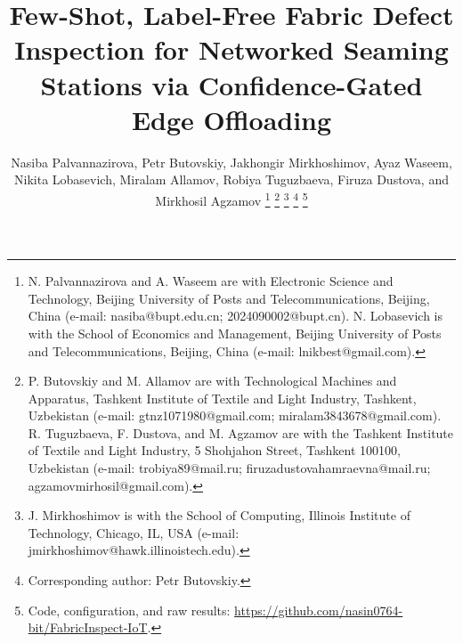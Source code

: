 \documentclass[lettersize,journal]{IEEEtran}
\begin{document}
\title{Few-Shot, Label-Free Fabric Defect Inspection for Networked Seaming Stations via Confidence-Gated Edge Offloading}

\author{Nasiba Palvannazirova, Petr Butovskiy, Jakhongir Mirkhoshimov, Ayaz Waseem, Nikita Lobasevich, Miralam Allamov, Robiya Tuguzbaeva, Firuza Dustova, and Mirkhosil Agzamov%
  \thanks{N. Palvannazirova and A. Waseem are with Electronic Science and Technology, Beijing University of Posts and Telecommunications, Beijing, China (e-mail: nasiba@bupt.edu.cn; 2024090002@bupt.cn). N. Lobasevich is with the School of Economics and Management, Beijing University of Posts and Telecommunications, Beijing, China (e-mail: lnikbest@gmail.com).}%
  \thanks{P. Butovskiy and M. Allamov are with Technological Machines and Apparatus, Tashkent Institute of Textile and Light Industry, Tashkent, Uzbekistan (e-mail: gtnz1071980@gmail.com; miralam3843678@gmail.com). R. Tuguzbaeva, F. Dustova, and M. Agzamov are with the Tashkent Institute of Textile and Light Industry, 5 Shohjahon Street, Tashkent 100100, Uzbekistan (e-mail: trobiya89@mail.ru; firuzadustovahamraevna@mail.ru; agzamovmirhosil@gmail.com).}%
  \thanks{J. Mirkhoshimov is with the School of Computing, Illinois Institute of Technology, Chicago, IL, USA (e-mail: jmirkhoshimov@hawk.illinoistech.edu).}%
  \thanks{Corresponding author: Petr Butovskiy.}%
  \thanks{Code, configuration, and raw results: \url{https://github.com/nasin0764-bit/FabricInspect-IoT}.}%
}


\maketitle
\end{document}
